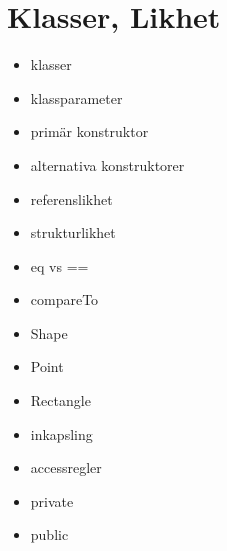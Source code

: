 \chapter{Klasser, Likhet}\label{chapter:W06}
\begin{itemize}[nosep]
\item klasser
\item klassparameter
\item primär konstruktor
\item alternativa konstruktorer
\item referenslikhet
\item strukturlikhet
\item eq vs ==
\item compareTo
\item Shape
\item Point
\item Rectangle
\item inkapsling
\item accessregler
\item private
\item public
\end{itemize}